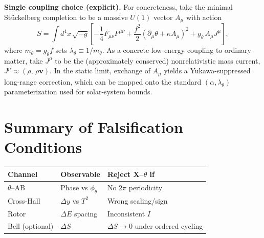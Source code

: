 ﻿\documentclass[twocolumn,aps,prd,nofootinbib]{revtex4-2}
\begin{document}
\noindent\textbf{Single coupling choice (explicit).} For concreteness, take the minimal St\"uckelberg completion to be a massive $U(1)$ vector $A_\mu$ with action
\begin{equation}
S=\int d^4x\,\sqrt{-g}\left[-\frac{1}{4}F_{\mu\nu}F^{\mu\nu}+\frac{f^2}{2}(\partial_\mu\theta+\kappa A_\mu)^2 + g_\theta\,A_\mu J^\mu\right],
\end{equation}
where $m_\theta=g_\theta f$ sets $\lambda_\theta\equiv 1/m_\theta$. As a concrete low-energy coupling to ordinary matter, take $J^\mu$ to be the (approximately conserved) nonrelativistic mass current, $J^\mu\approx (\rho,\,\rho\mathbf v)$. In the static limit, exchange of $A_\mu$ yields a Yukawa-suppressed long-range correction, which can be mapped onto the standard $(\alpha,\lambda_\theta)$ parameterization used for solar-system bounds.




\section*{Summary of Falsification Conditions}
\begin{center}
\begin{tabular}{|l|l|l|}
\hline
\textbf{Channel} & \textbf{Observable} & \textbf{Reject X--$\theta$ if} \\
\hline
$\theta$--AB & Phase vs $\phi_\theta$ & No $2\pi$ periodicity \\
\hline
Cross-Hall & $\Delta y$ vs $T^2$ & Wrong scaling/sign \\
\hline
Rotor & $\Delta E$ spacing & Inconsistent $I$ \\
\hline
Bell (optional) & $\Delta S$ & $\Delta S \to 0$ under ordered cycling \\
\hline
\end{tabular}
\end{center}



\appendix



\end{document}
